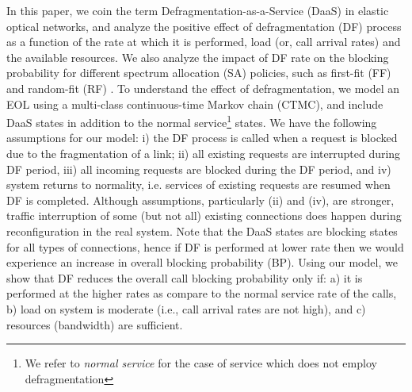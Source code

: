 \documentclass[letterpaper,10pt]{article}
\begin{document}
\par In this paper, we coin the term Defragmentation-as-a-Service (DaaS) in elastic optical networks, and analyze the  positive effect of defragmentation (DF) process as a function of the rate at which it is performed, load (or, call arrival rates) and the available resources. We also analyze the impact of DF rate on the blocking probability for different spectrum allocation (SA) policies, such as first-fit (FF) and random-fit (RF) \cite{yu2014exact,beyranvand2014analytical,Rosa2015}.
To understand the effect of defragmentation, we model an EOL using a multi-class continuous-time Markov chain (CTMC), and include DaaS states in addition to the normal service\footnote{We refer to \emph{normal service} for the case of service which does not employ defragmentation} states. We have the following assumptions for our model: i) the DF process is called when a request is blocked due to the fragmentation of a link; ii) all existing requests are interrupted during DF period, iii) all incoming requests are blocked during the DF period, and iv) system returns to normality, i.e. services of existing requests are resumed when DF is completed.
Although assumptions, particularly (ii) and (iv), are stronger, traffic interruption of some (but not all) existing connections does happen during reconfiguration in the real system. Note that the DaaS states are blocking states for all types of connections, hence if DF is performed at lower rate then we would experience an increase in overall blocking probability (BP). Using our model, we show that DF reduces the overall call blocking probability only if: a) it is performed at the higher rates as compare to the normal service rate of the calls, b) load on system is moderate (i.e., call arrival rates are not high), and c) resources (bandwidth) are sufficient.
\vspace{-2mm}
\end{document}

